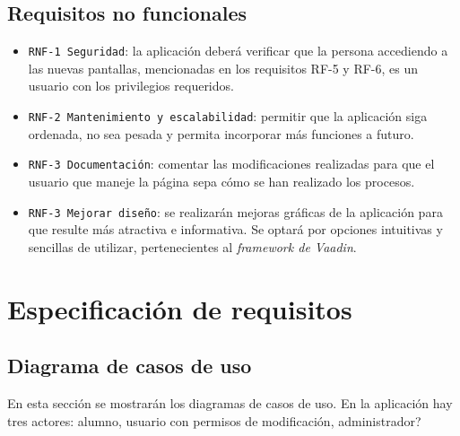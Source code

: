 \subsection{Requisitos no funcionales}
\begin{itemize}
	\item \texttt{RNF-1 Seguridad}: la aplicación deberá verificar que la persona accediendo a las nuevas pantallas, mencionadas en los requisitos RF-5 y RF-6, es un usuario con los privilegios requeridos.
	\item \texttt{RNF-2 Mantenimiento y escalabilidad}: permitir que la aplicación siga ordenada, no sea pesada y permita incorporar más funciones a futuro.
	\item \texttt{RNF-3 Documentación}: comentar las modificaciones realizadas para que el usuario que maneje la página sepa cómo se han realizado los procesos. 
	\item\texttt{RNF-3 Mejorar diseño}: se realizarán mejoras gráficas de la aplicación para que resulte más atractiva e informativa. Se optará por opciones intuitivas y sencillas de utilizar, pertenecientes al \emph{framework de Vaadin}.
\end{itemize}

\section{Especificación de requisitos}

\subsection{Diagrama de casos de uso}
En esta sección se mostrarán los diagramas de casos de uso. En la aplicación hay tres actores: alumno, usuario con permisos de modificación, administrador?


